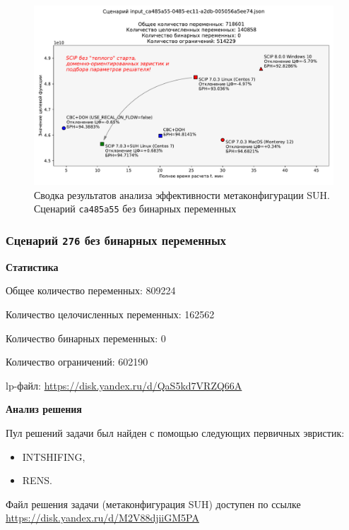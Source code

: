 \documentclass[%
	11pt,
	a4paper,
	utf8,
		]{article}
\begin{document}
\begin{figure}[!h]
	\centering
	\includegraphics[scale=0.6]{figures/summary_ca485a55.pdf}
	\caption{Сводка результатов анализа эффективности метаконфигурации SUH. \\Сценарий \texttt{ca485a55} без бинарных переменных}\label{fig:summary_ca485a55}
\end{figure}

\subsubsection{Сценарий \texttt{276} без бинарных переменных}

\textbf{Статистика}\vspace*{1mm}

Общее количество переменных: 809224

Количество целочисленных переменных: 162562

Количество бинарных переменных: 0

Количество ограничений: 602190

lp-файл: \url{https://disk.yandex.ru/d/QaS5kd7VRZQ66A}

\vspace*{5mm}\textbf{Анализ решения}\vspace*{1mm}

Пул решений задачи был найден с помощью следующих первичных эвристик:
\begin{itemize}
	\item INTSHIFING,
	
	\item RENS.
\end{itemize}

Файл решения задачи (метаконфигурация SUH) доступен по ссылке \url{https://disk.yandex.ru/d/M2V88djiiGM5PA}
\end{document}
